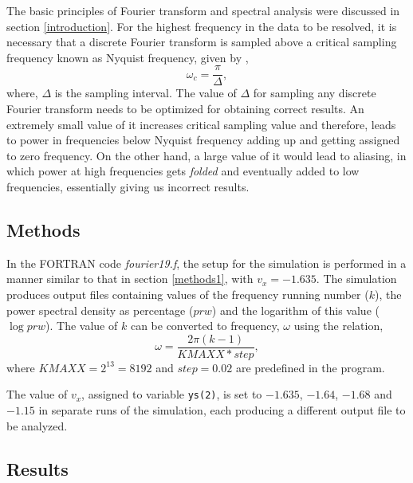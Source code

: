 \documentclass[a4paper]{article}
\begin{document}
	The basic principles of Fourier transform and spectral analysis were discussed in section \ref{introduction}. For the highest frequency in the data to be resolved, it is necessary that a discrete Fourier transform is sampled above a critical sampling frequency known as Nyquist frequency, given by \cite{lecture_4},
	\begin{equation}
		\omega_c = \frac{\pi}{\Delta},
		\label{eq:nyquist_freq}
	\end{equation} 
	where, \(\Delta\) is the sampling interval. The value of \(\Delta\) for sampling any discrete Fourier transform needs to be optimized for obtaining correct results. An extremely small value of it increases critical sampling value and therefore, leads to power in frequencies below Nyquist frequency adding up and getting assigned to zero frequency. On the other hand, a large value of it would lead to aliasing, in which power at high frequencies gets \emph{folded} and eventually added to low frequencies, essentially giving us incorrect results.
	
	
		\subsection{Methods} \label{methods2}
	
		In the FORTRAN code \emph{fourier19.f}, the setup for the simulation is performed in a manner similar to that in section \ref{methods1}, with \(v_x = -1.635\). The simulation produces output files containing values of the frequency running number (\(k\)), the power spectral density as percentage (\(prw\)) and the logarithm of this value (\(\log{prw}\)). The value of \(k\) can be converted to frequency, \(\omega\) using the relation,
		\begin{equation}
			\omega = \frac{2\pi (k-1)}{KMAXX*step},
			\label{eq:k_to_freq}
		\end{equation} 
		where \(KMAXX = 2^{13} = 8192\) and \(step = 0.02\) are predefined in the program.
		
		The value of \(v_x\), assigned to variable \texttt{ys(2)}, is set to \(-1.635\), \(-1.64\), \(-1.68\) and \(-1.15\) in separate runs of the simulation, each producing a different output file to be analyzed.
		
		
		\subsection{Results} \label{results2}
		
\end{document}
